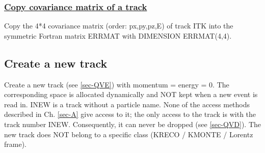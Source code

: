 \subsubsection{\underline{Copy covariance matrix of a track}}
\par
{}
\par
\par
Copy the 4*4 covariance matrix (order: px,py,pz,E) of track ITK
into the symmetric Fortran matrix ERRMAT with DIMENSION ERRMAT(4,4).
 
\subsection{\label{sec-QVN}Create a new track}
\par
Create a new track (see
\ref{sec-QVE}) with momentum = energy = 0. The
corresponding space is allocated dynamically and NOT kept when a new
event is read in.
INEW is a track without a particle name. None of the access methods
described in Ch.
\ref{sec-A} give access to it; the only access to the track is
with the track number INEW.
Consequently, it can never be dropped (see
\ref{sec-QVD}).
The new track does NOT belong to a specific class
(KRECO / KMONTE / Lorentz frame).
\par
